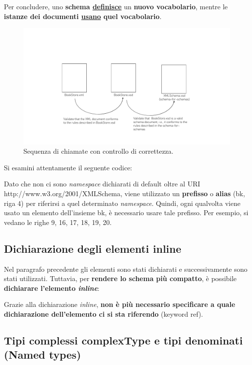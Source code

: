\documentclass[a4paper]{article}
\begin{document}
	\noindent
	Per concludere, uno \textbf{schema \underline{definisce}} un \textbf{nuovo vocabolario}, mentre le \textbf{istanze dei documenti \underline{usano} quel vocabolario}.\newpage
	
	\begin{figure}[!htp]
		\centering
		\includegraphics[width=\textwidth]{img/xml-calls-xsd.pdf}
		\caption{Sequenza di chiamate con controllo di correttezza.}
	\end{figure}
	
	\noindent
	Si esamini attentamente il seguente codice:
	
	Dato che non ci sono \emph{namespace} dichiarati di default oltre al URI \textsf{http://www.w3.org/2001/XMLSchema}, viene utilizzato un \textbf{prefisso} o \textbf{alias} (\textsf{bk}, riga 4) per riferirsi a quel determinato \emph{namespace}. Quindi, ogni qualvolta viene usato un elemento dell'insieme \textsf{bk}, è necessario usare tale prefisso. Per esempio, si vedano le righe 9, 16, 17, 18, 19, 20.\newpage
	
	\subsection{Dichiarazione degli elementi inline}\label{par: dichiarazione degli elementi inline}
	
	Nel paragrafo precedente gli elementi sono stati dichiarati e successivamente sono stati utilizzati. Tuttavia, per \textbf{rendere lo schema più compatto}, è possibile \textbf{dichiarare l'elemento \emph{inline}}:
	
	Grazie alla dichiarazione \emph{inline}, \textbf{non è più necessario specificare a quale dichiarazione dell'elemento ci si sta riferendo} (keyword \textsf{ref}).\newpage
	
	\subsection{Tipi complessi \textsf{complexType} e tipi denominati (\textsf{Named types})}\label{par: complexType}
	
\end{document}
